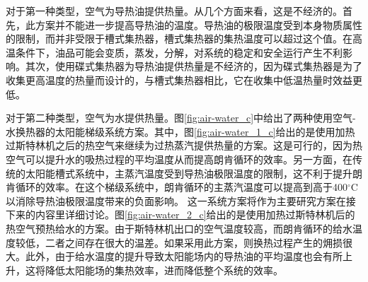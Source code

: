 对于第一种类型，空气为导热油提供热量。从几个方面来看，这是不经济的。首先，此方案并不能进一步提高导热油的温度。导热油的极限温度受到本身物质属性的限制，而并非受限于槽式集热器，槽式集热器的集热温度可以超过这个值。在高温条件下，油品可能会变质，蒸发，分解，对系统的稳定和安全运行产生不利影响。其次，使用碟式集热器为导热油提供热量是不经济的，因为碟式集热器是为了收集更高温度的热量而设计的，与槽式集热器相比，它在收集中低温热量时效益更低。

对于第二种类型，空气为水提供热量。图\ref{fig:air-water_c}中给出了两种使用空气-水换热器的太阳能梯级系统方案。其中，图\ref{fig:air-water_1_c}给出的是使用加热过斯特林机之后的热空气来继续为过热蒸汽提供热量的方案。这是可行的，因为热空气可以提升水的吸热过程的平均温度从而提高朗肯循环的效率。另一方面，在传统的太阳能槽式系统中，主蒸汽温度受到导热油极限温度的限制，这不利于提升朗肯循环的效率。在这个梯级系统中，朗肯循环的主蒸汽温度可以提高到高于400$\mathrm{^\circ C}$以消除导热油极限温度带来的负面影响。
这一系统方案将作为主要研究方案在接下来的内容里详细讨论。图\ref{fig:air-water_2_c}给出的是使用加热过斯特林机后的热空气预热给水的方案。由于斯特林机出口的空气温度较高，而朗肯循环的给水温度较低，二者之间存在很大的温差。如果采用此方案，则换热过程产生的㶲损很大。此外，由于给水温度的提升导致太阳能场内的导热油的平均温度也会有所上升，这将降低太阳能场的集热效率，进而降低整个系统的效率。
 
